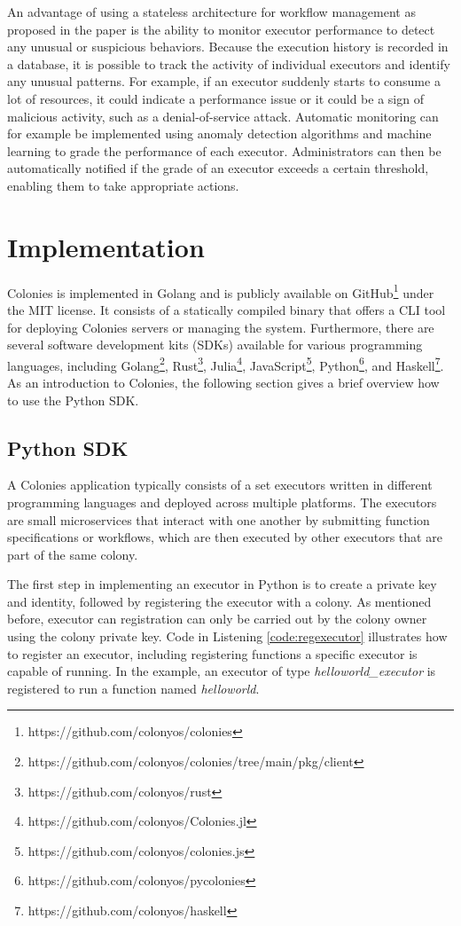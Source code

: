 \documentclass{article}
\begin{document}
An advantage of using a stateless architecture for workflow management as proposed in the paper is the ability to monitor executor performance to detect any unusual or suspicious behaviors. Because the execution history is recorded in a database, it is possible to track the activity of individual executors and identify any unusual patterns. For example, if an executor suddenly starts to consume a lot of resources, it could indicate a performance issue or it could be a sign of malicious activity, such as a denial-of-service attack. Automatic monitoring can for example be implemented using anomaly detection algorithms and machine learning to grade the performance of each executor. Administrators can then be automatically notified if the grade of an executor exceeds a certain threshold, enabling them to take appropriate actions.

\section{Implementation}
Colonies is implemented in Golang and is publicly available on GitHub\footnote{https://github.com/colonyos/colonies} under the MIT license. It consists of a statically compiled binary that offers a CLI tool for deploying Colonies servers or managing the system. Furthermore, there are several software development kits (SDKs) available for various programming languages, including Golang\footnote{https://github.com/colonyos/colonies/tree/main/pkg/client}, Rust\footnote{https://github.com/colonyos/rust}, Julia\footnote{https://github.com/colonyos/Colonies.jl}, JavaScript\footnote{https://github.com/colonyos/colonies.js}, Python\footnote{https://github.com/colonyos/pycolonies}, and Haskell\footnote{https://github.com/colonyos/haskell}. As an introduction to Colonies, the following section gives a brief overview how to use the Python SDK.

\subsection{Python SDK}
A Colonies application typically consists of a set executors written in different programming languages and deployed across multiple platforms. The executors are small microservices that interact with one another by submitting function specifications or workflows, which are then executed by other executors that are part of the same colony.

The first step in implementing an executor in Python is to create a private key and identity, followed by registering the executor with a colony. As mentioned before, executor can registration can only be carried out by the colony owner using the colony private key. Code in Listening \ref{code:regexecutor} illustrates how to register an executor, including registering functions a specific executor is capable of running. In the example, an executor of type \emph{helloworld\_executor} is registered to run a function named \emph{helloworld}.
\end{document}
